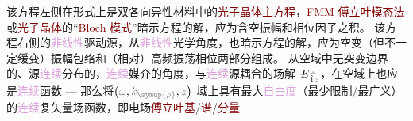 {\one} 该方程左侧在形式上是\textcolor{PineGreen}{双各向异性}材料\cite{berryOpticalSingularitiesBianisotropic2005,changWavePropagationBianisotropic2014}中的\textcolor{Maroon}{光子晶体主方程}\cite{sakodaOpticalPropertiesPhotonic2005,joannopoulosPhotonicCrystalsMolding2008}，\textcolor{Maroon}{FMM} \textcolor{Maroon}{傅立叶模态法}或\textcolor{Maroon}{光子晶体}的“\textcolor{Maroon}{Bloch 模式}”暗示方程的解，应为含空\textcolor{NavyBlue}{振幅}和\textcolor{NavyBlue}{相位}因子之积。{\two} 该方程右侧的\textcolor{Plum}{非线性}\textcolor{NavyBlue}{驱动源}，从\textcolor{Plum}{非线性}\textcolor{NavyBlue}{光学}角度，也暗示方程的解，应为空变（但不一定缓变）\textcolor{NavyBlue}{振幅}包络和（相对）高频振荡\textcolor{NavyBlue}{相位}两部分组成\cite{boydNonlinearOptics2019}。{\three} 从空域中无突变边界的、源\textcolor{Plum}{连续}分布的，\textcolor{Plum}{连续}媒介的角度，与\textcolor{Plum}{连续}源耦合的场解 $\xint{\mathcolor{gray}{-}}{25}{E}^{\;\!\mathcolor{gray}{\omega}}_{\;\! \hat{1} \mathcolor{gray}{z}}$，在空域上也应是\textcolor{Plum}{连续}函数 --- 那么将$\left( \mathcolor{gray}{\omega}, \mathcolor{gray}{\bar{k}_{\symup{\rho}}}, \mathcolor{gray}{z} \right)$ 域上具有最大\textcolor{Plum}{自由度}（最少限制/最广义）的\textcolor{Plum}{连续}复矢量场函数，即电场\textcolor{Maroon}{傅立叶基}/\textcolor{Maroon}{谱}/\textcolor{Maroon}{分量}
